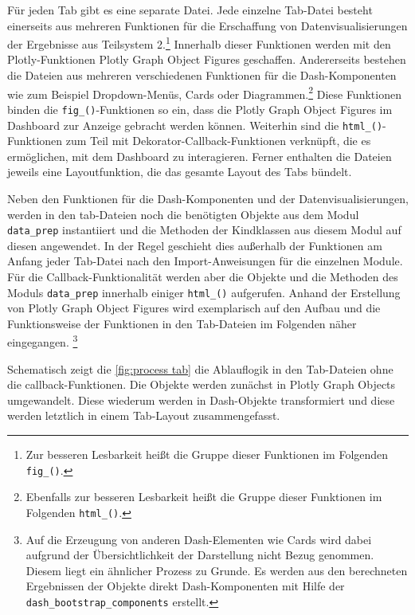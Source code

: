     Für jeden Tab gibt es eine separate Datei. Jede einzelne Tab-Datei besteht einerseits aus mehreren Funktionen für die Erschaffung von Datenvisualisierungen der
    Ergebnisse aus Teilsystem 2.\footnote{Zur besseren Lesbarkeit heißt die Gruppe dieser Funktionen im Folgenden \texttt{fig\_()}.}
    Innerhalb dieser Funktionen werden mit den Plotly-Funktionen Plotly Graph Object Figures geschaffen. 
    Andererseits bestehen die Dateien aus mehreren verschiedenen Funktionen für die Dash-Komponenten wie zum Beispiel Dropdown-Menüs, Cards oder Diagrammen.\footnote{Ebenfalls zur besseren Lesbarkeit
    heißt die Gruppe dieser Funktionen im Folgenden \texttt{html\_()}.}
    Diese Funktionen binden die \texttt{fig\_()}-Funktionen so ein, dass die Plotly Graph Object Figures im Dashboard zur Anzeige gebracht werden können. 
    Weiterhin sind die \texttt{html\_()}-Funktionen zum Teil mit Dekorator-Callback-Funktionen verknüpft, die es ermöglichen, mit dem Dashboard zu interagieren. 
    Ferner enthalten die Dateien jeweils eine Layoutfunktion, die das gesamte Layout des Tabs bündelt.

    Neben den Funktionen für die Dash-Komponenten und der Datenvisualisierungen, werden in den tab-Dateien noch die benötigten Objekte aus dem Modul \texttt{data\_prep} 
    instantiiert und die Methoden der Kindklassen aus diesem Modul auf diesen angewendet. In der Regel geschieht dies außerhalb der Funktionen am Anfang 
    jeder Tab-Datei nach den Import-Anweisungen für die einzelnen Module. Für die Callback-Funktionalität werden aber die Objekte und die Methoden des Moduls \texttt{data\_prep} innerhalb einiger \texttt{html\_()} aufgerufen.
    Anhand der Erstellung von Plotly Graph Object Figures wird exemplarisch auf den Aufbau und die Funktionsweise der Funktionen in den Tab-Dateien im Folgenden näher eingegangen.
    \footnote{Auf die Erzeugung von anderen Dash-Elementen wie Cards wird dabei aufgrund der Übersichtlichkeit der Darstellung nicht Bezug genommen. Diesem liegt ein ähnlicher Prozess
    zu Grunde. Es werden aus den berechneten Ergebnissen der Objekte direkt Dash-Komponenten mit Hilfe der \texttt{dash\_bootstrap\_components} erstellt.}
    
    Schematisch zeigt die \autoref{fig:process tab} die Ablauflogik in den Tab-Dateien ohne die callback-Funktionen.
    Die Objekte werden zunächst in Plotly Graph Objects umgewandelt. Diese wiederum werden in Dash-Objekte transformiert und diese werden 
    letztlich in einem Tab-Layout zusammengefasst.
    
